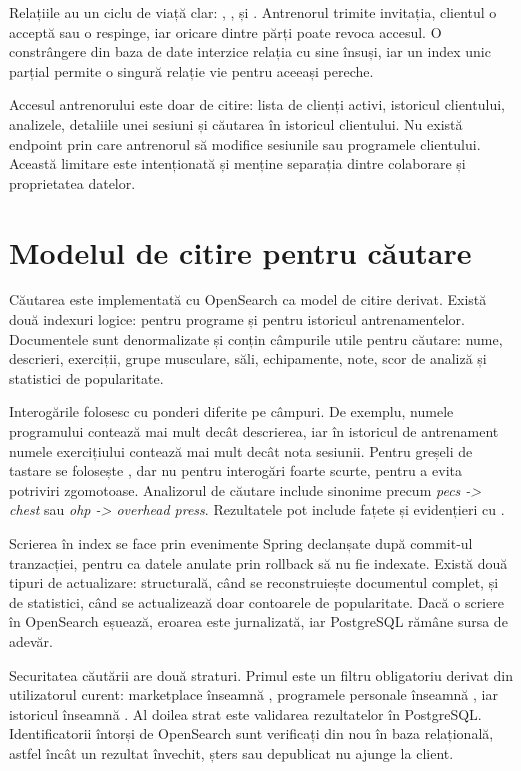 Relațiile au un ciclu de viață clar: , ,  și
. Antrenorul trimite invitația, clientul o acceptă sau o respinge, iar oricare dintre
părți poate revoca accesul. O constrângere din baza de date interzice relația cu sine însuși, iar un
index unic parțial permite o singură relație vie pentru aceeași pereche.

Accesul antrenorului este doar de citire: lista de clienți activi, istoricul clientului, analizele,
detaliile unei sesiuni și căutarea în istoricul clientului. Nu există endpoint prin care antrenorul să
modifice sesiunile sau programele clientului. Această limitare este intenționată și menține separația
dintre colaborare și proprietatea datelor.

\section{Modelul de citire pentru căutare}
\label{sec:cautare}

Căutarea este implementată cu OpenSearch ca model de citire derivat. Există două indexuri logice:
 pentru programe și  pentru istoricul antrenamentelor. Documentele
sunt denormalizate și conțin câmpurile utile pentru căutare: nume, descrieri, exerciții, grupe
musculare, săli, echipamente, note, scor de analiză și statistici de popularitate.

Interogările folosesc  cu ponderi diferite pe câmpuri. De exemplu, numele programului
contează mai mult decât descrierea, iar în istoricul de antrenament numele exercițiului contează mai
mult decât nota sesiunii. Pentru greșeli de tastare se folosește , dar nu pentru
interogări foarte scurte, pentru a evita potriviri zgomotoase. Analizorul de căutare include sinonime
precum \emph{pecs -> chest} sau \emph{ohp -> overhead press}. Rezultatele pot include fațete și
evidențieri cu .

Scrierea în index se face prin evenimente Spring declanșate după commit-ul tranzacției, pentru ca
datele anulate prin rollback să nu fie indexate. Există două tipuri de actualizare: structurală, când
se reconstruiește documentul complet,
și de statistici, când se actualizează doar contoarele de popularitate. Dacă o scriere în OpenSearch
eșuează, eroarea este jurnalizată, iar PostgreSQL rămâne sursa de adevăr.

Securitatea căutării are două straturi. Primul este un filtru obligatoriu derivat din utilizatorul
curent: marketplace înseamnă , programele personale înseamnă
, iar istoricul înseamnă . Al doilea strat este
validarea rezultatelor în PostgreSQL. Identificatorii întorși de OpenSearch sunt verificați din nou
în baza relațională, astfel încât un rezultat învechit, șters sau depublicat nu ajunge la client.

